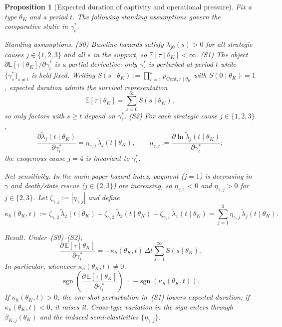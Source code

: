 \documentclass[ecta,nameyear,final,supplement]{econsocart}
\numberwithin{equation}{section}
\numberwithin{table}{section}
\newtheorem{proposition}[theorem]{Proposition}
\theoremstyle{definition}
\begin{document}
\begin{proposition}[Expected duration of captivity and operational pressure]
\label{prop:expected-captivity-gamma}
Fix a type $\theta_K$ and a period $t$. The following standing assumptions
govern the comparative static in $\gamma_t^\ast$.

\medskip
\noindent\textit{Standing assumptions.}
\textup{(S0)} Baseline hazards satisfy $\lambda_{j0}(s)>0$ for all strategic
causes $j\in\{1,2,3\}$ and all $s$ in the support, so
$\mathbb{E}[\tau\mid\theta_K]<\infty$.
\textup{(S1)} The object $\partial\mathbb{E}[\tau\mid\theta_K]/\partial\gamma_t^\ast$
is a partial derivative: only $\gamma_t^\ast$ is perturbed at period $t$ while
$\{\gamma_s^\ast\}_{s\neq t}$ is held fixed. Writing
$S(s\mid\theta_K):=\prod_{r=1}^{s}p_{\mathrm{Cont},r\mid\theta_K}$ with
$S(0\mid\theta_K)=1$, expected duration admits the survival representation
\begin{equation}
\label{eq:duracion-identidad-prop}
\mathbb{E}[\tau\mid\theta_K]=\sum_{s=0}^{\infty}S(s\mid\theta_K),
\end{equation}
so only factors with $s\ge t$ depend on $\gamma_t^\ast$.
\textup{(S2)} For each strategic cause $j\in\{1,2,3\}$,
\[
\frac{\partial\tilde\lambda_j(t\mid\theta_K)}{\partial\gamma_t^\ast}
=\eta_{\gamma,j}\,\tilde\lambda_j(t\mid\theta_K),
\qquad
\eta_{\gamma,j}:=\frac{\partial\ln\tilde\lambda_j(t\mid\theta_K)}{\partial\gamma_t^\ast};
\]
the exogenous cause $j=4$ is invariant to $\gamma_t^\ast$.

\medskip
\noindent\textit{Net sensitivity.}
In the main-paper hazard index, payment ($j=1$) is decreasing in $\gamma$ and
death/state rescue ($j\in\{2,3\}$) are increasing, so $\eta_{\gamma,1}<0$ and
$\eta_{\gamma,j}>0$ for $j\in\{2,3\}$. Let $\zeta_{\gamma,j}:=|\eta_{\gamma,j}|$
and define
\begin{equation}
\label{eq:kappa-c}
\kappa_h(\theta_K,t)
:=\zeta_{\gamma,2}\,\tilde\lambda_2(t\mid\theta_K)
 +\zeta_{\gamma,3}\,\tilde\lambda_3(t\mid\theta_K)
 -\zeta_{\gamma,1}\,\tilde\lambda_1(t\mid\theta_K)
=\sum_{j=1}^{3}\eta_{\gamma,j}\,\tilde\lambda_j(t\mid\theta_K).
\end{equation}

\medskip
\noindent\textit{Result.}
Under~\textup{(S0)--(S2)},
\begin{equation}
\label{eq:dE-dgamma-prop}
\frac{\partial\,\mathbb{E}[\tau\mid\theta_K]}{\partial\gamma_t^\ast}
=-\kappa_h(\theta_K,t)\,\Delta t\sum_{s=t}^{\infty}S(s\mid\theta_K).
\end{equation}
In particular, whenever $\kappa_h(\theta_K,t)\neq 0$,
\begin{equation}
\operatorname{sgn}\!\left(
  \frac{\partial\,\mathbb{E}[\tau\mid\theta_K]}{\partial\gamma_t^\ast}
\right)
=-\operatorname{sgn}\!\left(\kappa_h(\theta_K,t)\right).
\end{equation}
If $\kappa_h(\theta_K,t)>0$, the one-shot perturbation in~\textup{(S1)} lowers
expected duration; if $\kappa_h(\theta_K,t)<0$, it raises it. Cross-type
variation in the sign enters through $\beta_{K,j}(\theta_K)$ and the induced
semi-elasticities $\{\eta_{\gamma,j}\}$.
\end{proposition}
\end{document}
